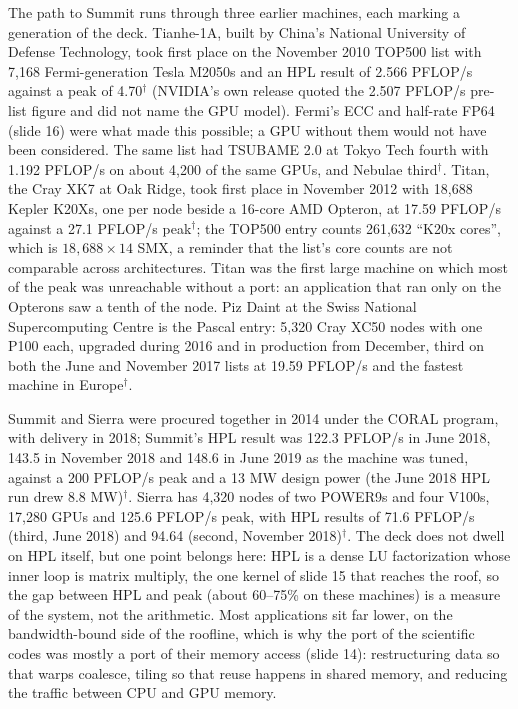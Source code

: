\documentclass[11pt,letterpaper]{article}
\begin{document}
The path to Summit runs through three earlier machines, each marking a generation of the deck. Tianhe-1A, built by China's National University of Defense Technology, took first place on the November 2010 TOP500 list with 7,168 Fermi-generation Tesla M2050s and an HPL result of 2.566 PFLOP/s against a peak of 4.70$^\dagger$ (NVIDIA's own release quoted the 2.507 PFLOP/s pre-list figure and did not name the GPU model). Fermi's ECC and half-rate FP64 (slide 16) were what made this possible; a GPU without them would not have been considered. The same list had TSUBAME 2.0 at Tokyo Tech fourth with 1.192 PFLOP/s on about 4,200 of the same GPUs, and Nebulae third$^\dagger$. Titan, the Cray XK7 at Oak Ridge, took first place in November 2012 with 18,688 Kepler K20Xs, one per node beside a 16-core AMD Opteron, at 17.59 PFLOP/s against a 27.1 PFLOP/s peak$^\dagger$; the TOP500 entry counts 261,632 ``K20x cores'', which is $18{,}688 \times 14$ SMX, a reminder that the list's core counts are not comparable across architectures. Titan was the first large machine on which most of the peak was unreachable without a port: an application that ran only on the Opterons saw a tenth of the node. Piz Daint at the Swiss National Supercomputing Centre is the Pascal entry: 5,320 Cray XC50 nodes with one P100 each, upgraded during 2016 and in production from December, third on both the June and November 2017 lists at 19.59 PFLOP/s and the fastest machine in Europe$^\dagger$.

Summit and Sierra were procured together in 2014 under the CORAL program, with delivery in 2018; Summit's HPL result was 122.3 PFLOP/s in June 2018, 143.5 in November 2018 and 148.6 in June 2019 as the machine was tuned, against a 200 PFLOP/s peak and a 13 MW design power (the June 2018 HPL run drew 8.8 MW)$^\dagger$. Sierra has 4,320 nodes of two POWER9s and four V100s, 17,280 GPUs and 125.6 PFLOP/s peak, with HPL results of 71.6 PFLOP/s (third, June 2018) and 94.64 (second, November 2018)$^\dagger$. The deck does not dwell on HPL itself, but one point belongs here: HPL is a dense LU factorization whose inner loop is matrix multiply, the one kernel of slide 15 that reaches the roof, so the gap between HPL and peak (about 60--75\% on these machines) is a measure of the system, not the arithmetic. Most applications sit far lower, on the bandwidth-bound side of the roofline, which is why the port of the scientific codes was mostly a port of their memory access (slide 14): restructuring data so that warps coalesce, tiling so that reuse happens in shared memory, and reducing the traffic between CPU and GPU memory.
\end{document}
